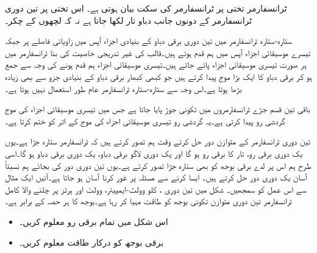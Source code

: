 ٹرانسفارمر  تختی پر ٹرانسفارمر کی سکت بیان ہوتی ہے۔ اس تختی پر تین دوری ٹرانسفارمر کے دونوں جانب  دباو تار  لکھا جاتا ہے  نہ کہ لچھوں کے چکر۔

ستارہ-ستارہ ٹرانسفارمر میں تین دوری برقی دباو  کے بنیادی اجزاء آپس میں   زاویائی فاصلے پر جبکہ  تیسرے موسیقائی اجزاء آپس میں ہم قدم ہوتے ہیں۔قالب کی غیر تدریجی خاصیت کی بنا ٹرانسفارمر میں ہر صورت تیسری موسیقائی اجزاء پائے جاتے ہیں۔تیسری موسیقائی اجزاء ہم قدم ہونے کی وجہ سے جمع ہو کر  برقی دباو کا ایک بڑا موج پیدا کرتے ہیں جو کبھی کبھار برقی دباو کے بنیادی جزو سے بھی زیادہ بڑھا ہوتا ہے۔اس وجہ سے ستارہ-ستارہ  ٹرانسفارمر عام طور استعمال نہیں ہوتا ہے۔

باقی تین قسم جڑے ٹرانسفارمروں میں تکونی جوڑ پایا جاتا ہے جس میں تیسری موسیقائی اجزاء کی موج گردشی رو پیدا کرتی ہے۔یہ گردشی رو تیسری موسیقائی اجزاء کی موج کے اثر کو ختم کرتا ہے۔



تین دوری ٹرانسفارمر کے متوازن دور حل کرتے وقت ہم تصور کرتے ہیں کہ ٹرانسفارمر ستارہ جڑا  ہے۔یوں یک دوری برقی رو، تار  کا برقی رو ہو گا اور یک دوری لاگو برقی دباو، یک دوری برقی دباو  ہو گا۔اسی طرح ہم اس پر لدے برقی بوجھ کو بھی ستارہ جڑا تصور کرتے ہے۔یوں تین دوری دور کی بجائے  ہم نسبتاً آسان یک دوری دور حل کرتے ہیں۔ ایسا کرنے سے مسئلہ پر غور کرنا آسان ہو جاتا ہے۔آئیں ایک مثال سے اس عمل کو  سمجھیں۔
%
شکل   میں تین دوری ،    کلو وولٹ-ایمپیئر،    وولٹ اور  ہرٹز پر چلنے والا کامل ٹرانسفارمر تین دوری متوازن تکونی بوجھ کو طاقت مہیا کر رہا ہے۔بوجھ کا ہر حصہ  کے برابر ہے۔
\begin{itemize}
\item
اس شکل میں تمام برقی رو معلوم کریں۔
\item
برقی بوجھ کو درکار طاقت معلوم کریں۔
\end{itemize}

